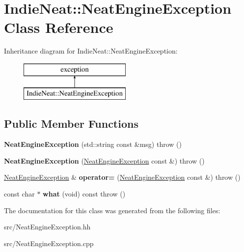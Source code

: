 \hypertarget{class_indie_neat_1_1_neat_engine_exception}{}\section{Indie\+Neat\+:\+:Neat\+Engine\+Exception Class Reference}
\label{class_indie_neat_1_1_neat_engine_exception}
Inheritance diagram for Indie\+Neat\+:\+:Neat\+Engine\+Exception\+:\begin{figure}[H]
\begin{center}
\leavevmode
\includegraphics[height=2.000000cm]{class_indie_neat_1_1_neat_engine_exception}
\end{center}
\end{figure}
\subsection*{Public Member Functions}
\begin{DoxyCompactItemize}
\item 
\mbox{\label{class_indie_neat_1_1_neat_engine_exception_a47aeecd069e952c8f2a099bdb071de7c}} 
{\bfseries Neat\+Engine\+Exception} (std\+::string const \&msg)  throw ()
\item 
\mbox{\label{class_indie_neat_1_1_neat_engine_exception_a55ce9805a9033945380d1926ebd4ada4}} 
{\bfseries Neat\+Engine\+Exception} (\hyperlink{class_indie_neat_1_1_neat_engine_exception}{Neat\+Engine\+Exception} const \&)  throw ()
\item 
\mbox{\label{class_indie_neat_1_1_neat_engine_exception_a28dfd2e238c68fc58faaeae3bf13fc54}} 
\hyperlink{class_indie_neat_1_1_neat_engine_exception}{Neat\+Engine\+Exception} \& {\bfseries operator=} (\hyperlink{class_indie_neat_1_1_neat_engine_exception}{Neat\+Engine\+Exception} const \&)  throw ()
\item 
\mbox{\label{class_indie_neat_1_1_neat_engine_exception_a007205e8f089da458f2728708f9d7c4c}} 
const char $\ast$ {\bfseries what} (void) const  throw ()
\end{DoxyCompactItemize}


The documentation for this class was generated from the following files\+:\begin{DoxyCompactItemize}
\item 
src/Neat\+Engine\+Exception.\+hh\item 
src/Neat\+Engine\+Exception.\+cpp\end{DoxyCompactItemize}
